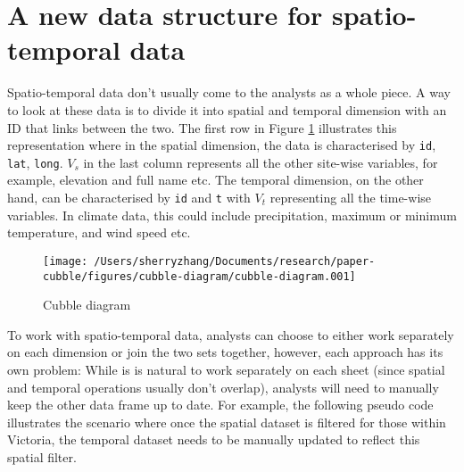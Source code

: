 \documentclass{article}
\newenvironment{Shaded}{\begin{snugshade}}{\end{snugshade}}
\newcommand{\FunctionTok}[1]{\textcolor[rgb]{0.00,0.00,0.00}{#1}}
\newcommand{\NormalTok}[1]{#1}
\newcommand{\OtherTok}[1]{\textcolor[rgb]{0.56,0.35,0.01}{#1}}
\newcommand{\SpecialCharTok}[1]{\textcolor[rgb]{0.00,0.00,0.00}{#1}}
\begin{document}
\newpage

\hypertarget{a-new-data-structure-for-spatio-temporal-data}{%
\section{A new data structure for spatio-temporal
data}\label{a-new-data-structure-for-spatio-temporal-data}}

Spatio-temporal data don't usually come to the analysts as a whole
piece. A way to look at these data is to divide it into spatial and
temporal dimension with an ID that links between the two. The first row
in Figure \ref{fig:cubble-diagram} illustrates this representation where
in the spatial dimension, the data is characterised by \texttt{id},
\texttt{lat}, \texttt{long}. \(V_s\) in the last column represents all
the other site-wise variables, for example, elevation and full name etc.
The temporal dimension, on the other hand, can be characterised by
\texttt{id} and \texttt{t} with \(V_t\) representing all the time-wise
variables. In climate data, this could include precipitation, maximum or
minimum temperature, and wind speed etc.

\begin{figure}

{\centering \texttt{[image: /Users/sherryzhang/Documents/research/paper-cubble/figures/cubble-diagram/cubble-diagram.001]} 

}

\caption{Cubble diagram}\label{fig:cubble-diagram}
\end{figure}

To work with spatio-temporal data, analysts can choose to either work
separately on each dimension or join the two sets together, however,
each approach has its own problem: While is is natural to work
separately on each sheet (since spatial and temporal operations usually
don't overlap), analysts will need to manually keep the other data frame
up to date. For example, the following pseudo code illustrates the
scenario where once the spatial dataset is filtered for those within
Victoria, the temporal dataset needs to be manually updated to reflect
this spatial filter.

\begin{Shaded}
\end{Shaded}
\end{document}

